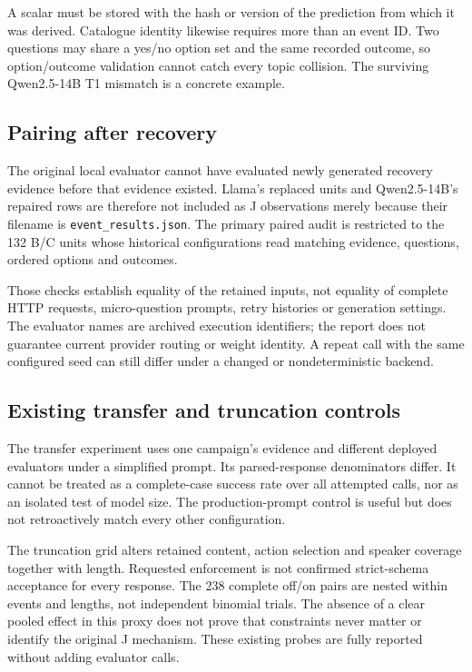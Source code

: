 A scalar must be stored with the hash or version of the prediction from which it was derived. Catalogue identity likewise requires more than an event ID. Two questions may share a yes/no option set and the same recorded outcome, so option/outcome validation cannot catch every topic collision. The surviving Qwen2.5-14B T1 mismatch is a concrete example.

\subsection{Pairing after recovery}
The original local evaluator cannot have evaluated newly generated recovery evidence before that evidence existed. Llama's replaced units and Qwen2.5-14B's repaired rows are therefore not included as J observations merely because their filename is \texttt{event\_results.json}. The primary paired audit is restricted to the 132 B/C units whose historical configurations read matching evidence, questions, ordered options and outcomes.

Those checks establish equality of the retained inputs, not equality of complete HTTP requests, micro-question prompts, retry histories or generation settings. The evaluator names are archived execution identifiers; the report does not guarantee current provider routing or weight identity. A repeat call with the same configured seed can still differ under a changed or nondeterministic backend.

\subsection{Existing transfer and truncation controls}
The transfer experiment uses one campaign's evidence and different deployed evaluators under a simplified prompt. Its parsed-response denominators differ. It cannot be treated as a complete-case success rate over all attempted calls, nor as an isolated test of model size. The production-prompt control is useful but does not retroactively match every other configuration.

The truncation grid alters retained content, action selection and speaker coverage together with length. Requested enforcement is not confirmed strict-schema acceptance for every response. The 238 complete off/on pairs are nested within events and lengths, not independent binomial trials. The absence of a clear pooled effect in this proxy does not prove that constraints never matter or identify the original J mechanism. These existing probes are fully reported without adding evaluator calls.


